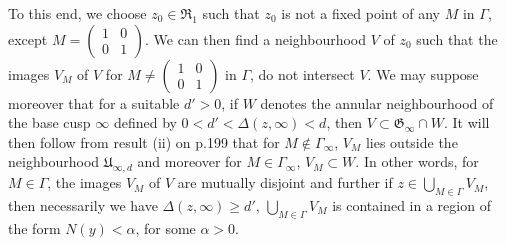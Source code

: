 To this end, we choose $z_{0}\in\mathfrak{R}_{1}$ such that $z_{0}$ is
not a fixed point of any $M$ in $\Gamma$, except
$M=\left(\begin{smallmatrix} 1 & 0\\ 0 & 1
\end{smallmatrix}\right)$. We can then find a neighbourhood $V$ of
$z_{0}$ such that the images $V_{M}$ of $V$ for $M\neq
\left(\begin{smallmatrix} 1 & 0 \\ 0 & 1
\end{smallmatrix}\right)$ in $\Gamma$, do not intersect $V$. We may
suppose moreover that for a suitable $d'>0$, if $W$ denotes the
annular neighbourhood of the base cusp $\infty$ defined by
$0<d'<\Delta(z,\infty)<d$, then $V\subset \mathfrak{G}_{\infty}\cap
W$. It will then follow from result (ii) on p.\@ 199 that for
$M\not\in \Gamma_{\infty}$, $V_{M}$ lies outside the neighbourhood
$\mathfrak{U}_{\infty,d}$ and moreover for $M\in\Gamma_{\infty}$,
$V_{M}\subset W$. In other words, for $M\in\Gamma$, the images $V_{M}$
of $V$ are mutually disjoint and further if
$z\in\bigcup\limits_{M\in\Gamma}V_{M}$, then necessarily we have
$\Delta(z,\infty)\geq d'$, \ie $\bigcup\limits_{M\in\Gamma}V_{M}$ is
contained in a region of the form $N(y)<\alpha$, for some $\alpha>0$.

